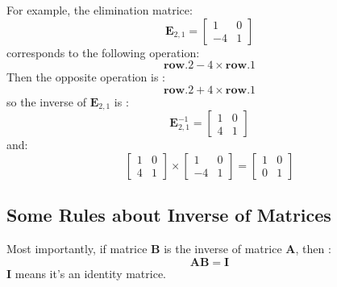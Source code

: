         For example, the elimination matrice:
            \begin{equation}
                \mathbf{E}_{2,1} = 
                \begin{bmatrix}
                    1 & 0 \\
                    \boxed{-4} & 1
                \end{bmatrix}
            \end{equation}
        corresponds to the following operation:
            \begin{equation}
                \mathbf{row.2} - 4 \times \mathbf{row.1}
            \end{equation}
        Then the opposite operation is :
            \begin{equation}
                \mathbf{row.2} + 4 \times \mathbf{row.1}
            \end{equation}
        so the inverse of $\mathbf{E}_{2,1}$ is :
            \begin{equation}
                \mathbf{E}_{2,1}^{-1}
                = 
                \begin{bmatrix}
                    1 & 0 \\
                    \boxed{4} & 1
                \end{bmatrix}
            \end{equation}
        and:
            \begin{equation}
                \begin{bmatrix}
                    1 & 0 \\
                    \boxed{4} & 1
                \end{bmatrix}
                \times
                \begin{bmatrix}
                    1 & 0 \\
                    \boxed{-4} & 1
                \end{bmatrix}
                =
                \begin{bmatrix}
                    1 & 0 \\
                    0 & 1
                \end{bmatrix}
            \end{equation}
    
    \subsection{Some Rules about Inverse of Matrices}
        Most importantly, if matrice \textbf{B} is the inverse of matrice \textbf{A}, then :
            \begin{equation}
                \mathbf{A} \mathbf{B} = \mathbf{I}
            \end{equation}
        \textbf{I} means it's an identity matrice.

